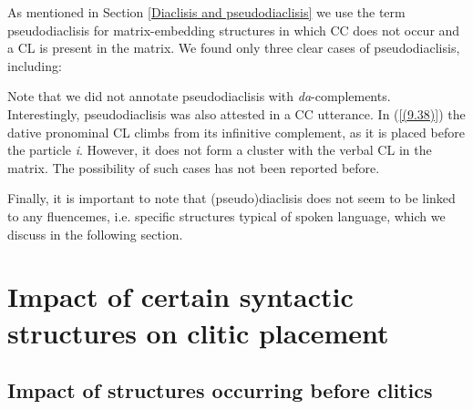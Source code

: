 \noindent As mentioned in Section \ref{Diaclisis and pseudodiaclisis} we use the term pseudodiaclisis for matrix-em\-bed\-ding structures in which CC does not occur and a CL is present in the matrix. We found only three clear cases of pseudodiaclisis, including:


\noindent Note that we did not annotate pseudodiaclisis with \textit{da}-complements. Interestingly, pseudodiaclisis was also attested in a CC utterance. In (\ref{(9.38)}) the dative pronominal CL climbs from its infinitive complement, as it is placed before the particle \textit{i}. However, it does not form a cluster with the verbal CL in the matrix. The possibility of such cases has not been reported before.


\noindent Finally, it is important to note that (pseudo)diaclisis does not seem to be linked to any fluencemes, i.e. specific structures typical of spoken language, which we discuss in the following section.

\section{Impact of certain syntactic structures on clitic placement}
\label{Impact}
\subsection{Impact of structures occurring before clitics}

